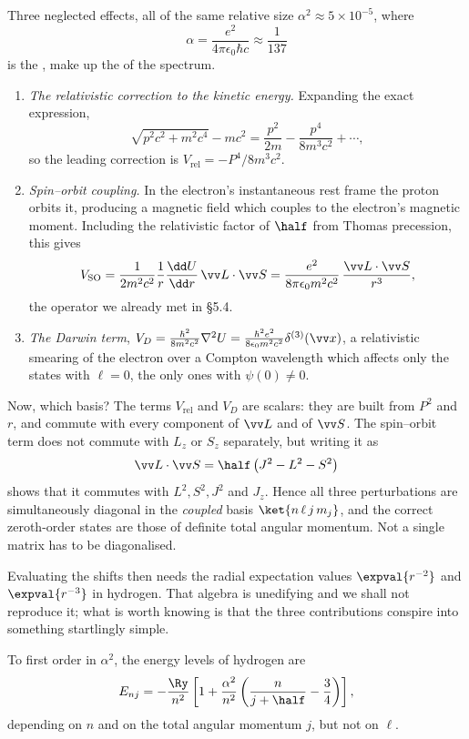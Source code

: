 Three neglected effects, all of the same relative size $\alpha^2 \approx 5\times10^{-5}$, where
$$
\alpha = \frac{e^2}{4\pi\epsilon_0 \hbar c} \approx \frac{1}{137}
$$
is the , make up the  of the spectrum.
\begin{enumerate}[label=(\roman*)]
    \item \emph{The relativistic correction to the kinetic energy.} Expanding the exact expression,
    $$
    \sqrt{p^2c^2 + m^2c^4} - mc^2 = \frac{p^2}{2m} - \frac{p^4}{8m^3c^2} + \cdots,
    $$
    so the leading correction is $V_{\mathrm{rel}} = -P^4/8m^3c^2$.
    \item \emph{Spin--orbit coupling.} In the electron's instantaneous rest frame the proton orbits it, producing a magnetic field which couples to the electron's magnetic moment. Including the relativistic factor of $\half$ from Thomas precession, this gives
    $$
    V_{\mathrm{SO}} = \frac{1}{2m^2c^2}\frac{1}{r}\frac{\dd U}{\dd r}\,\vv L \cdot \vv S = \frac{e^2}{8\pi\epsilon_0 m^2c^2}\,\frac{\vv L\cdot\vv S}{r^3},
    $$
    the operator we already met in \S5.4.
    \item \emph{The Darwin term}, $V_D = \frac{\hbar^2}{8m^2c^2}\nabla^2 U = \frac{\hbar^2e^2}{8\epsilon_0m^2c^2}\delta^{(3)}(\vv x)$, a relativistic smearing of the electron over a Compton wavelength which affects only the states with $\ell = 0$, the only ones with $\psi(0)\neq0$.
\end{enumerate}

Now, which basis? The terms $V_{\mathrm{rel}}$ and $V_D$ are scalars: they are built from $P^2$ and $r$, and commute with every component of $\vv L$ and of $\vv S$. The spin--orbit term does not commute with $L_z$ or $S_z$ separately, but writing it as
$$
\vv L \cdot \vv S = \half\left( J^2 - L^2 - S^2 \right)
$$
shows that it commutes with $L^2, S^2, J^2$ and $J_z$. Hence all three perturbations are simultaneously diagonal in the \emph{coupled} basis $\ket{n\,\ell\,j\,m_j}$, and the correct zeroth-order states are those of definite total angular momentum. Not a single matrix has to be diagonalised.

Evaluating the shifts then needs the radial expectation values $\expval{r^{-2}}$ and $\expval{r^{-3}}$ in hydrogen. That algebra is unedifying and we shall not reproduce it; what is worth knowing is that the three contributions conspire into something startlingly simple.

\begin{theorem}
    To first order in $\alpha^2$, the energy levels of hydrogen are
    $$
    E_{n j} = -\frac{\Ry}{n^2}\left[ 1 + \frac{\alpha^2}{n^2}\left( \frac{n}{j+\half} - \frac34 \right) \right],
    $$
    depending on $n$ and on the total angular momentum $j$, but not on $\ell$.
\end{theorem}

